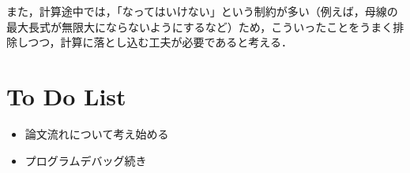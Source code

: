 \documentclass[11pt]{jsarticle}
\begin{document}
			また，計算途中では，「なってはいけない」という制約が多い（例えば，母線の最大長式が無限大にならないようにするなど）ため，こういったことをうまく排除しつつ，計算に落とし込む工夫が必要であると考える．
	\section{To Do List}
		\begin{itemize}
			\item 論文流れについて考え始める
			\item プログラムデバッグ続き
		\end{itemize}
				
	\newpage
\vspace{10cm}
	

\vspace{14cm}
	\articleSPRfour
	\articleSPRfive
\end{document}
